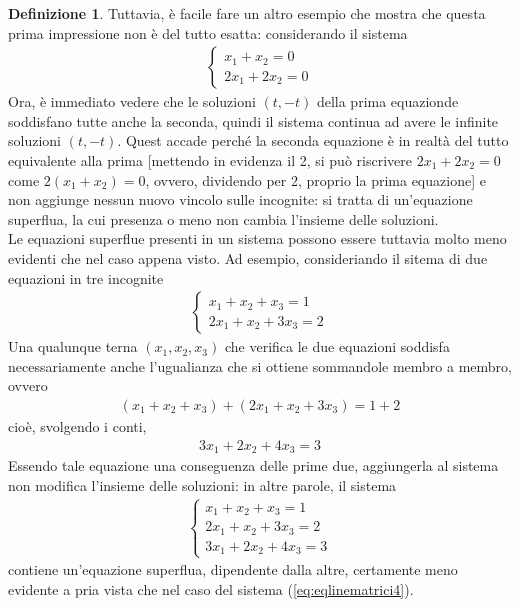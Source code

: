 \documentclass{book}
\theoremstyle{definition}
\newtheorem{defi}{Definizione}[section]
\theoremstyle{plain}
\begin{document}
\begin{defi}
  Tuttavia, è facile fare un altro esempio che mostra che questa prima
  impressione non è del tutto esatta: considerando il sistema
  \begin{eqnarray}
    \label{eq:eqlinematrici4}
    \begin{cases}
      x_1+x_2=0 \\
      2x_1+2x_2=0
    \end{cases}
  \end{eqnarray}
  Ora, è immediato vedere che le soluzioni $(t,-t)$ della prima equazionde
  soddisfano tutte anche la seconda, quindi il sistema continua ad avere
  le infinite soluzioni $(t,-t)$. Quest accade perché la seconda equazione
  è in realtà del tutto equivalente alla prima [mettendo in evidenza il
  2, si può riscrivere $2x_1+2x_2=0$ come $2(x_1+x_2)=0$, ovvero,
  dividendo per 2, proprio la prima equazione] e non aggiunge nessun
  nuovo vincolo sulle incognite: si tratta di un'equazione superflua, la
  cui presenza o meno non cambia l'insieme delle soluzioni.\\
  Le equazioni superflue presenti in un sistema possono essere tuttavia
  molto meno evidenti che nel caso appena visto. Ad esempio, consideriando
  il sitema di due equazioni in tre incognite
  \begin{eqnarray}
    \label{eq:eqlinematrici5}
    \begin{cases}
      x_1+x_2+x_3=1\\
      2x_1+x_2+3x_3=2
    \end{cases}
  \end{eqnarray}
  Una qualunque terna $(x_1,x_2,x_3)$ che verifica le due equazioni
  soddisfa necessariamente anche l'ugualianza che si ottiene sommandole
  membro a membro, ovvero
  \begin{eqnarray*}
    (x_1+x_2+x_3) + (2x_1+x_2+3x_3) = 1+2
  \end{eqnarray*}
  cioè, svolgendo i conti,
  \begin{eqnarray*}
    3x_1+2x_2+4x_3=3
  \end{eqnarray*}
  Essendo tale equazione una conseguenza delle prime due, aggiungerla al
  sistema non modifica l'insieme delle soluzioni: in altre parole, il
  sistema
  \begin{eqnarray}
    \label{eq:eqlinematrici6}
    \begin{cases}
      x_1+x_2+x_3=1\\
      2x_1+x_2+3x_3=2\\
      3x_1+2x_2+4x_3=3
    \end{cases}
  \end{eqnarray}
  contiene un'equazione superflua, dipendente dalla altre, certamente meno
  evidente a pria vista che nel caso del sistema
  (\ref{eq:eqlinematrici4}).


\end{defi}
\end{document}
